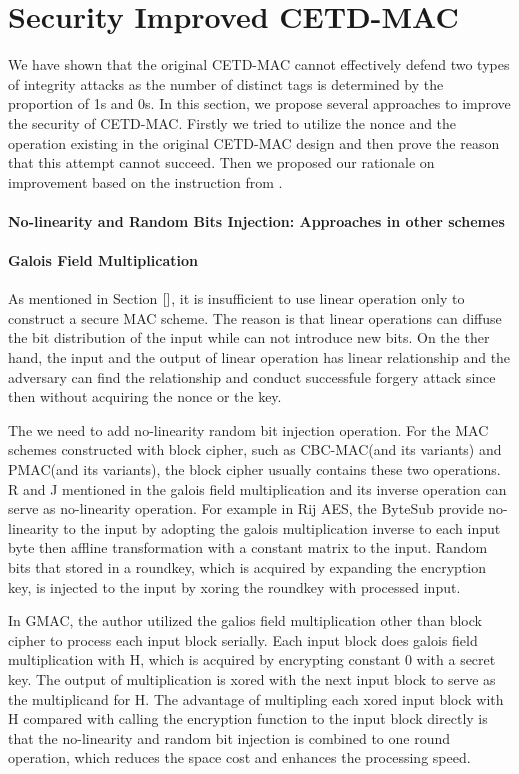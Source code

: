 \section{Security Improved CETD-MAC}
We have shown that the original CETD-MAC cannot effectively defend two types of integrity attacks as the number of distinct tags is determined by the proportion of 1s and 0s. In this section, we propose several approaches to improve the security of CETD-MAC. Firstly we tried to utilize the nonce and the operation existing in the original CETD-MAC design and then prove the reason that this attempt cannot succeed. Then we proposed our rationale on improvement based on the instruction from \cite{}.  
\paragraph{No-linearity and Random Bits Injection: Approaches in other schemes}
\paragraph{Galois Field Multiplication}
As mentioned in Section $\ref{}$, it is insufficient to use linear operation
only to construct a secure MAC scheme. The reason is that linear operations can
diffuse the bit distribution of the input while can not introduce new bits. On
the ther hand, the input and the output of linear operation has linear
relationship and the adversary can find the relationship and conduct successfule
forgery attack since then without acquiring the nonce or the key.

The we need to add no-linearity random bit injection operation. For the MAC
schemes constructed with block cipher, such as CBC-MAC(and its variants) and
PMAC(and its variants), the block cipher usually contains these two operations.
R and J mentioned in \cite{} the galois field multiplication and its inverse
operation can serve as no-linearity operation. 
For example in Rij AES, the ByteSub provide no-linearity to the input by
adopting the galois multiplication inverse to each input byte then affline
transformation with a constant matrix to the input. Random bits that stored in a
roundkey, which is acquired by expanding the encryption key, is injected to the
input by xoring the roundkey with processed input.  

In GMAC, the author utilized the galios field multiplication other than block
cipher to process each input block serially. Each input block does galois field
multiplication with H, which is acquired by encrypting constant 0 with a secret
key. The output of multiplication is xored with the next input block to serve as
the multiplicand for H. The advantage of multipling each xored input block with
H compared with calling the encryption function to the input block directly is
that the no-linearity and random bit injection is combined to one round
operation, which reduces the space cost and enhances the processing speed.

